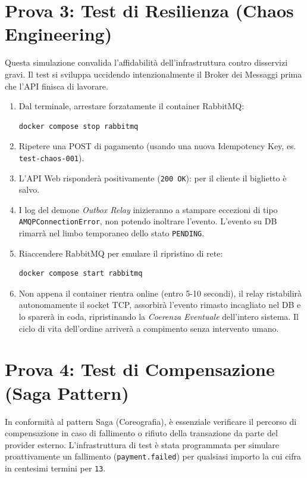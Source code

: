 \documentclass[11pt,a4paper]{report}
\begin{document}
\section{Prova 3: Test di Resilienza (Chaos Engineering)}
Questa simulazione convalida l'affidabilit\`a dell'infrastruttura contro disservizi gravi. Il test si sviluppa uccidendo intenzionalmente il Broker dei Messaggi prima che l'API finisca di lavorare.

\begin{enumerate}
    \item Dal terminale, arrestare forzatamente il container RabbitMQ:
    \begin{lstlisting}[language=bash]
docker compose stop rabbitmq
    \end{lstlisting}
    \item Ripetere una POST di pagamento (usando una nuova Idempotency Key, es. \texttt{test-chaos-001}).
    \item L'API Web risponder\`a positivamente (\texttt{200 OK}): per il cliente il biglietto \`e salvo.
    \item I log del demone \textit{Outbox Relay} inizieranno a stampare eccezioni di tipo \texttt{AMQPConnectionError}, non potendo inoltrare l'evento. L'evento su DB rimarr\`a nel limbo temporaneo dello stato \texttt{PENDING}.
    \item Riaccendere RabbitMQ per emulare il ripristino di rete:
    \begin{lstlisting}[language=bash]
docker compose start rabbitmq
    \end{lstlisting}
    \item Non appena il container rientra online (entro 5-10 secondi), il relay ristabilir\`a autonomamente il socket TCP, assorbir\`a l'evento rimasto incagliato nel DB e lo sparer\`a in coda, ripristinando la \textit{Coerenza Eventuale} dell'intero sistema. Il ciclo di vita dell'ordine arriver\`a a compimento senza intervento umano.
\end{enumerate}

\section{Prova 4: Test di Compensazione (Saga Pattern)}
In conformit\`a al pattern Saga (Coreografia), \`e essenziale verificare il percorso di compensazione in caso di fallimento o rifiuto della transazione da parte del provider esterno. L'infrastruttura di test \`e stata programmata per simulare proattivamente un fallimento (\texttt{payment.failed}) per qualsiasi importo la cui cifra in centesimi termini per \texttt{13}.
\end{document}

